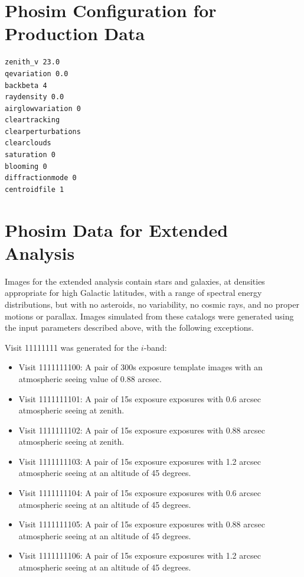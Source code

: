 \documentclass[prd, nofootinbib, floatfix, 11pt,tightenlines,times]{article}
\begin{document}
\clearpage 
\begin{appendices}
\section{Phosim Configuration for Production Data \label{sec-phosim}}
\begin{verbatim}
zenith_v 23.0
qevariation 0.0
backbeta 4
raydensity 0.0
airglowvariation 0
cleartracking
clearperturbations
clearclouds
saturation 0
blooming 0
diffractionmode 0
centroidfile 1
\end{verbatim}

\section{Phosim Data for Extended Analysis \label{sec-phosimextend}}

Images for the extended analysis contain stars and galaxies, at
densities appropriate for high Galactic latitudes, with a range of
spectral energy distributions, but with no asteroids, no variability,
no cosmic rays, and no proper motions or parallax.  Images simulated
from these catalogs were generated using the input parameters
described above, with the following exceptions.

Visit 11111111 was generated for the $i$-band:
\begin{itemize}
\item Visit 1111111100: A pair of 300s exposure template images with
  an atmospheric seeing value of 0.88 arcsec.
\item Visit 1111111101: A pair of 15s exposure exposures with 0.6
arcsec atmospheric seeing at zenith.
\item Visit 1111111102: A pair of 15s exposure exposures with 0.88
arcsec atmospheric seeing at zenith.
\item Visit 1111111103: A pair of 15s exposure exposures with 1.2
arcsec atmospheric seeing at an altitude of 45 degrees.
\item Visit 1111111104: A pair of 15s exposure exposures with 0.6
arcsec atmospheric seeing at an altitude of 45 degrees.
\item Visit 1111111105: A pair of 15s exposure exposures with 0.88
arcsec atmospheric seeing at an altitude of 45 degrees.
\item Visit 1111111106: A pair of 15s exposure exposures with 1.2
arcsec atmospheric seeing at an altitude of 45 degrees.
\end{itemize}


\end{appendices}
\end{document}
